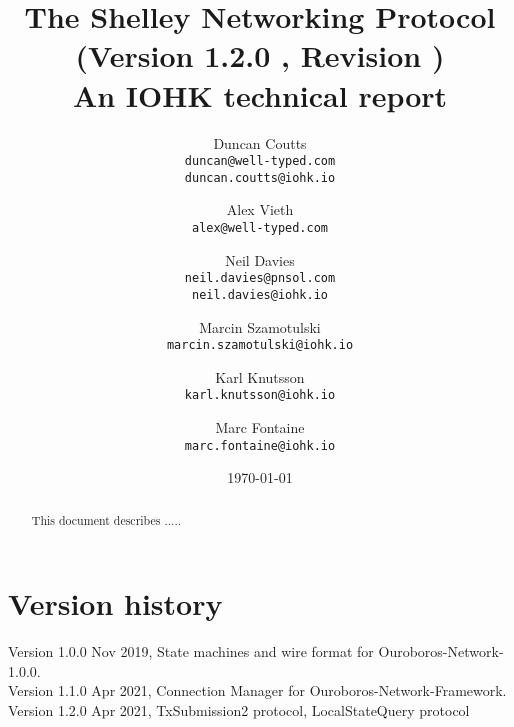\documentclass{report}
\begin{document}
\title{The Shelley Networking Protocol \\
  {\small (Version 1.2.0 , Revision )} \\
  {\large \sc An IOHK technical report}}
\author{Duncan Coutts \\ {\small \texttt{duncan@well-typed.com}} \\
                         {\small \texttt{duncan.coutts@iohk.io}}
   \and Alex Vieth \\ {\small \texttt{alex@well-typed.com}}
   \and Neil Davies \\ {\small \texttt{neil.davies@pnsol.com}} \\
                       {\small \texttt{neil.davies@iohk.io}}
   \and Marcin Szamotulski \\ {\small \texttt{marcin.szamotulski@iohk.io}}
   \and Karl Knutsson \\ {\small \texttt{karl.knutsson@iohk.io}}
   \and Marc Fontaine \\ {\small \texttt{marc.fontaine@iohk.io}}
   }
\date{\today}

\maketitle

\begin{abstract}
  This document describes .....
\end{abstract}

\tableofcontents

\section*{Version history}

\begin{description}
\item[Version 1.0.0 Nov 2019, State machines and wire format for Ouroboros-Network-1.0.0.]
\item[Version 1.1.0 Apr 2021, Connection Manager for Ouroboros-Network-Framework.]
\item[Version 1.2.0 Apr 2021, TxSubmission2 protocol, LocalStateQuery protocol]
\end{description}
% 




% 

\appendix




\end{document}
